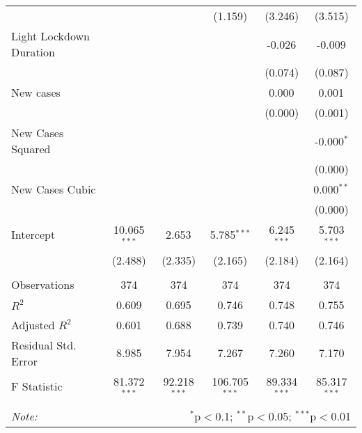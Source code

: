 \begin{tabular}{@{\extracolsep{5pt}}lccccc}
  & & & (1.159) & (3.246) & (3.515) \\
 Light Lockdown Duration & & & & -0.026$^{}$ & -0.009$^{}$ \\
  & & & & (0.074) & (0.087) \\
 New cases & & & & 0.000$^{}$ & 0.001$^{}$ \\
  & & & & (0.000) & (0.001) \\
 New Cases Squared & & & & & -0.000$^{*}$ \\
  & & & & & (0.000) \\
 New Cases Cubic & & & & & 0.000$^{**}$ \\
  & & & & & (0.000) \\
 Intercept & 10.065$^{***}$ & 2.653$^{}$ & 5.785$^{***}$ & 6.245$^{***}$ & 5.703$^{***}$ \\
  & (2.488) & (2.335) & (2.165) & (2.184) & (2.164) \\
\hline \\[-1.8ex]
 Observations & 374 & 374 & 374 & 374 & 374 \\
 $R^2$ & 0.609 & 0.695 & 0.746 & 0.748 & 0.755 \\
 Adjusted $R^2$ & 0.601 & 0.688 & 0.739 & 0.740 & 0.746 \\
 Residual Std. Error & 8.985 & 7.954 & 7.267 & 7.260 & 7.170  \\
 F Statistic & 81.372$^{***}$  & 92.218$^{***}$  & 106.705$^{***}$  & 89.334$^{***}$  & 85.317$^{***}$  \\
\hline
\hline \\[-1.8ex]
\textit{Note:} & \multicolumn{5}{r}{$^{*}$p$<$0.1; $^{**}$p$<$0.05; $^{***}$p$<$0.01} \\
\end{tabular}
